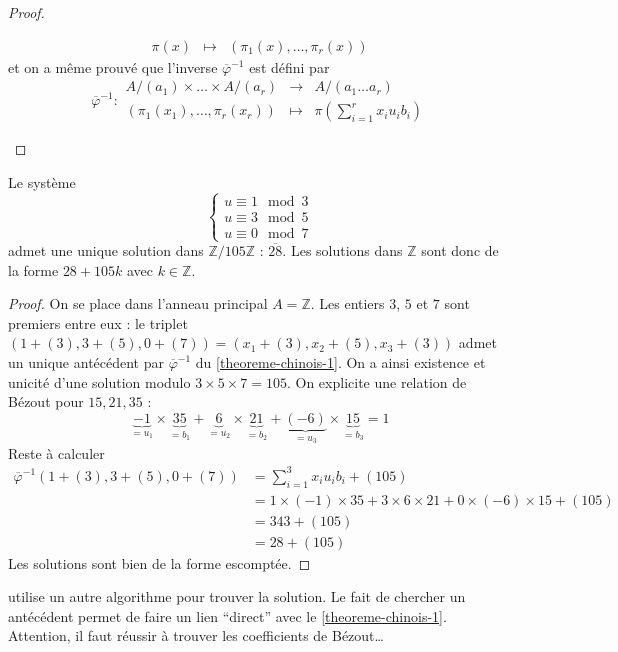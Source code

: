 \begin{proof}
\begin{enumerate}[label=(\roman*)]
\[\begin{array}{ccc}
          \pi(x) &\mapsto& (\pi_1(x), \dots, \pi_r(x))
        \end{array}
      \]
      et on a même prouvé que l'inverse $\overline{\varphi}^{-1}$ est défini par
      \[
      \overline{\varphi}^{-1} :
      \begin{array}{ccc}
        A/(a_1) \times \dots \times A/(a_r) &\rightarrow& A/(a_1 \dots a_r) \\
        (\pi_1(x_1), \dots, \pi_r(x_r)) &\mapsto& \pi \left( \sum_{i=1}^{r} x_i u_i b_i \right)
      \end{array}
      \]
    \end{enumerate}
  \end{proof}


  \begin{example}
    Le système
    \[
    \begin{cases}
      u \equiv 1 \mod 3 \\
      u \equiv 3 \mod 5 \\
      u \equiv 0 \mod 7
    \end{cases}
    \]
    admet une unique solution dans $\mathbb{Z}/105\mathbb{Z}$ : $\overline{28}$. Les solutions dans $\mathbb{Z}$ sont donc de la forme $28 + 105k$ avec $k \in \mathbb{Z}$.
  \end{example}

  \begin{proof}
    On se place dans l'anneau principal $A = \mathbb{Z}$. Les entiers $3$, $5$ et $7$ sont premiers entre eux : le triplet $(1 + (3), 3 + (5), 0 + (7)) = (x_1 + (3), x_2 + (5), x_3 + (3))$ admet un unique antécédent par $\overline{\varphi}^{-1}$ du \cref{theoreme-chinois-1}. On a ainsi existence et unicité d'une solution modulo $3 \times 5 \times 7 = 105$. On explicite une relation de Bézout pour $15, 21, 35$ :
    \[ \underbrace{-1}_{=u_1} \times \underbrace{35}_{=b_1} + \underbrace{6}_{=u_2} \times \underbrace{21}_{=b_2} + \underbrace{(-6)}_{=u_3} \times \underbrace{15}_{=b_3} = 1 \]
    Reste à calculer
    \begin{align*}
      \overline{\varphi}^{-1}(1 + (3), 3 + (5), 0 + (7)) &= \sum_{i=1}^3 x_i u_i b_i + (105) \\
      &= 1 \times (-1) \times 35 + 3 \times 6 \times 21 + 0 \times (-6) \times 15  + (105) \\
      &= 343 + (105) \\
      &= 28 + (105)
    \end{align*}
    Les solutions sont bien de la forme escomptée.
  \end{proof}

  \cite{[ULM18]} utilise un autre algorithme pour trouver la solution. Le fait de chercher un antécédent permet de faire un lien ``direct'' avec le \cref{theoreme-chinois-1}. Attention, il faut réussir à trouver les coefficients de Bézout\dots

